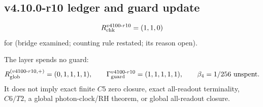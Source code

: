 \subsection*{v4.10.0-r10 ledger and guard update}
\label{subsec:v4100-r10-ledger-guard}

\[
R_{\rm chk}^{v4100\text{-}r10}=(1,1,0)
\]
for (bridge examined; counting rule restated; its reason open).

The layer spends no guard:
\[
R_{\rm glob}^{(v4100\text{-}r10,+)}=(0,1,1,1,1),
\qquad
\Gamma_{\rm guard}^{v4100\text{-}r10}=(1,1,1,1,1),
\qquad
\beta_4=1/256\ \text{unspent}.
\]
It does not imply exact finite \(C5\) zero closure, exact all-readout terminality,
\(C6/T2\), a global photon-clock/RH theorem, or global all-readout closure.
